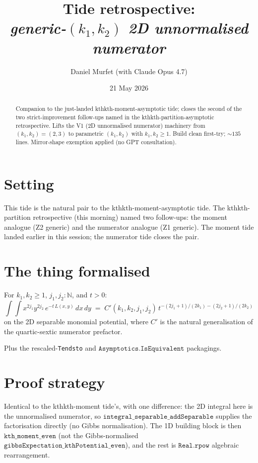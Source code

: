 \documentclass[11pt]{article}
\title{Tide retrospective: \\\emph{generic-$(k_1, k_2)$ 2D unnormalised numerator}}
\author{Daniel Murfet (with Claude Opus 4.7)}
\date{21 May 2026}
\begin{document}
\maketitle

\begin{abstract}
Companion to the just-landed kthkth-moment-asymptotic tide; closes
the second of the two strict-improvement follow-ups named in the
kthkth-partition-asymptotic retrospective. Lifts the V1 (2D
unnormalised numerator) machinery from $(k_1, k_2) = (2, 3)$ to
parametric $(k_1, k_2)$ with $k_1, k_2 \ge 1$. Build clean first-try;
${\sim}135$ lines. Mirror-shape exemption applied (no GPT
consultation).
\end{abstract}

\section{Setting}

This tide is the natural pair to the kthkth-moment-asymptotic tide.
The kthkth-partition retrospective (this morning) named two
follow-ups: the moment analogue (Z2 generic) and the numerator
analogue (Z1 generic). The moment tide landed earlier in this
session; the numerator tide closes the pair.

\section{The thing formalised}

For $k_1, k_2 \ge 1$, $j_1, j_2 : \mathbb{N}$, and $t > 0$:
\[
  \int\!\!\!\int x^{2j_1} y^{2j_2}\,e^{-t\,L(x,y)}\,dx\,dy
    \;=\; C'(k_1, k_2, j_1, j_2)\,
            t^{-(2j_1+1)/(2k_1) - (2j_2+1)/(2k_2)}
\]
on the 2D separable monomial potential, where $C'$ is the natural
generalisation of the
quartic-sextic numerator prefactor.

Plus the rescaled-\texttt{Tendsto} and
$\texttt{Asymptotics.IsEquivalent}$ packagings.

\section{Proof strategy}

Identical to the kthkth-moment tide's, with one difference: the 2D
integral here is the unnormalised numerator, so
$\texttt{integral\_separable\_addSeparable}$ supplies the
factorisation directly (no Gibbs normalisation). The 1D building
block is then $\texttt{kth\_moment\_even}$ (not the Gibbs-normalised
$\texttt{gibbsExpectation\_kthPotential\_even}$), and the rest is
$\texttt{Real.rpow}$ algebraic rearrangement.
\end{document}
